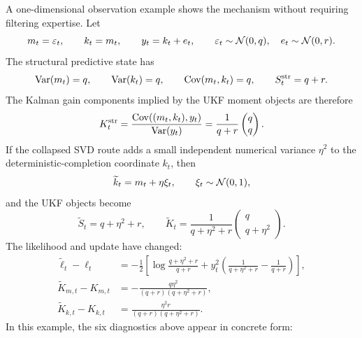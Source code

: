 A one-dimensional observation example shows the mechanism without requiring
filtering expertise.  Let
\begin{equation}
  m_t=\varepsilon_t,\qquad k_t=m_t,\qquad
  y_t=k_t+e_t,\qquad
  \varepsilon_t\sim\mathcal{N}(0,q),\quad e_t\sim\mathcal{N}(0,r).
\end{equation}
The structural predictive state has
\[
  \operatorname{Var}(m_t)=q,\qquad
  \operatorname{Var}(k_t)=q,\qquad
  \operatorname{Cov}(m_t,k_t)=q,
  \qquad
  S_t^{\mathrm{str}}=q+r.
\]
The Kalman gain components implied by the UKF moment objects are therefore
\[
  K_t^{\mathrm{str}}
  =
  \frac{\operatorname{Cov}((m_t,k_t),y_t)}{\operatorname{Var}(y_t)}
  =
  \frac{1}{q+r}
  \begin{pmatrix}q\\ q\end{pmatrix}.
  \label{eq:bf-structural-gain-identity-example}
\]
If the collapsed SVD route adds a small independent numerical variance
$\eta^2$ to the deterministic-completion coordinate $k_t$, then
\begin{equation}
  \widetilde k_t=m_t+\eta\xi_t,\qquad
  \xi_t\sim\mathcal{N}(0,1),
\end{equation}
and the UKF objects become
\[
  \widetilde S_t=q+\eta^2+r,\qquad
  \widetilde K_t
  =
  \frac{1}{q+\eta^2+r}
  \begin{pmatrix}q\\ q+\eta^2\end{pmatrix}.
  \label{eq:bf-collapsed-gain-identity-example}
\]
The likelihood and update have changed:
\begin{align}
  \widetilde\ell_t-\ell_t
  &=
  -\frac12
  \left[
    \log\frac{q+\eta^2+r}{q+r}
    +
    y_t^2
    \left(\frac{1}{q+\eta^2+r}-\frac{1}{q+r}\right)
  \right],\\
  \widetilde K_{m,t}-K_{m,t}
  &=
  -\frac{q\eta^2}{(q+r)(q+\eta^2+r)},\\
  \widetilde K_{k,t}-K_{k,t}
  &=
  \frac{\eta^2 r}{(q+r)(q+\eta^2+r)} .
  \label{eq:bf-collapsed-ukf-likelihood-gain-change}
\end{align}
In this example, the six diagnostics above appear in concrete form:
